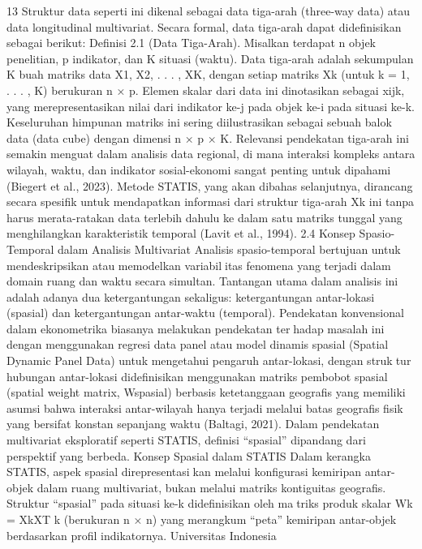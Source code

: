 13
Struktur data seperti ini dikenal sebagai data tiga-arah (three-way data) atau data
longitudinal multivariat. Secara formal, data tiga-arah dapat didefinisikan sebagai berikut:
Definisi 2.1 (Data Tiga-Arah). Misalkan terdapat n objek penelitian, p indikator, dan K
situasi (waktu). Data tiga-arah adalah sekumpulan K buah matriks data {X1, X2, . . . , XK},
dengan setiap matriks Xk (untuk k = 1, . . . , K) berukuran n × p.
Elemen skalar dari data ini dinotasikan sebagai xijk, yang merepresentasikan nilai dari
indikator ke-j pada objek ke-i pada situasi ke-k. Keseluruhan himpunan matriks ini sering
diilustrasikan sebagai sebuah balok data (data cube) dengan dimensi n × p × K.
Relevansi pendekatan tiga-arah ini semakin menguat dalam analisis data regional,
di mana interaksi kompleks antara wilayah, waktu, dan indikator sosial-ekonomi sangat
penting untuk dipahami (Biegert et al., 2023). Metode STATIS, yang akan dibahas
selanjutnya, dirancang secara spesifik untuk mendapatkan informasi dari struktur tiga-arah
{Xk} ini tanpa harus merata-ratakan data terlebih dahulu ke dalam satu matriks tunggal
yang menghilangkan karakteristik temporal (Lavit et al., 1994).
2.4 Konsep Spasio-Temporal dalam Analisis Multivariat
Analisis spasio-temporal bertujuan untuk mendeskripsikan atau memodelkan variabilitas fenomena yang terjadi dalam domain ruang dan waktu secara simultan. Tantangan
utama dalam analisis ini adalah adanya dua ketergantungan sekaligus: ketergantungan
antar-lokasi (spasial) dan ketergantungan antar-waktu (temporal).
Pendekatan konvensional dalam ekonometrika biasanya melakukan pendekatan terhadap masalah ini dengan menggunakan regresi data panel atau model dinamis spasial
(Spatial Dynamic Panel Data) untuk mengetahui pengaruh antar-lokasi, dengan struktur hubungan antar-lokasi didefinisikan menggunakan matriks pembobot spasial (spatial
weight matrix, Wspasial) berbasis ketetanggaan geografis yang memiliki asumsi bahwa
interaksi antar-wilayah hanya terjadi melalui batas geografis fisik yang bersifat konstan
sepanjang waktu (Baltagi, 2021). Dalam pendekatan multivariat eksploratif seperti STATIS,
definisi “spasial” dipandang dari perspektif yang berbeda.
Konsep Spasial dalam STATIS Dalam kerangka STATIS, aspek spasial direpresentasikan melalui konfigurasi kemiripan antar-objek dalam ruang multivariat, bukan melalui
matriks kontiguitas geografis. Struktur “spasial” pada situasi ke-k didefinisikan oleh matriks produk skalar Wk = XkXT
k
(berukuran n × n) yang merangkum “peta” kemiripan
antar-objek berdasarkan profil indikatornya.
Universitas Indonesia

